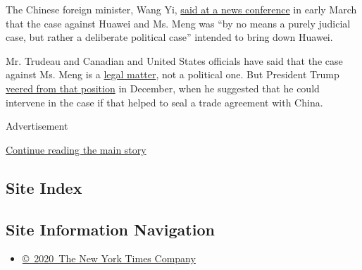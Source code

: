 The Chinese foreign minister, Wang Yi,
\href{https://www.caixinglobal.com/2019-03-08/beijing-backs-huaweis-lawsuit-against-us-government-101389531.html}{said
at a news conference} in early March that the case against Huawei and
Ms. Meng was ``by no means a purely judicial case, but rather a
deliberate political case'' intended to bring down Huawei.

Mr. Trudeau and Canadian and United States officials have said that the
case against Ms. Meng is a
\href{https://www.nytimes.com/2019/01/23/world/canada/canada-huawei-china-ambassador.html}{legal
matter}, not a political one. But President Trump
\href{https://www.nytimes.com/2018/12/12/us/politics/trump-meng-wanzhou-huawei-extradition.html}{veered
from that position} in December, when he suggested that he could
intervene in the case if that helped to seal a trade agreement with
China.

Advertisement

\protect\hyperlink{after-bottom}{Continue reading the main story}

\hypertarget{site-index}{%
\subsection{Site Index}\label{site-index}}

\hypertarget{site-information-navigation}{%
\subsection{Site Information
Navigation}\label{site-information-navigation}}

\begin{itemize}
\tightlist
\item
  \href{https://help.nytimes.com/hc/en-us/articles/115014792127-Copyright-notice}{©~2020~The
  New York Times Company}
\end{itemize}

